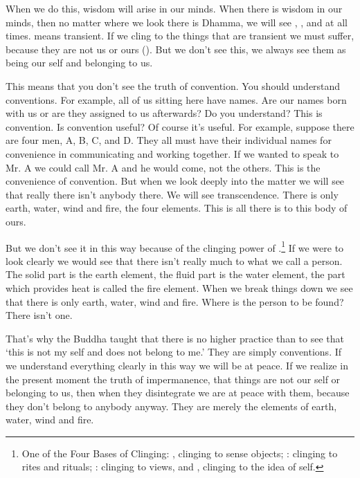 When we do this, wisdom will arise in our minds. When there is wisdom in our minds, then no matter where we look there is Dhamma, we will see , , and  at all times.  means transient. If we cling to the things that are transient we must suffer,  because they are not us or ours (). But we don't see this, we always see them as being our self and belonging to us. 

This means that you don't see the truth of convention. You should understand conventions. For example, all of us sitting here have names. Are our names born with us or are they assigned to us afterwards? Do you understand? This is convention. Is convention useful? Of course it's useful. For example, suppose there are four men, A, B, C, and D. They all must have their individual names for convenience in communicating and working together. If we wanted to speak to Mr. A we could call Mr. A and he would come, not the others. This is the convenience of convention. But when we look deeply into the matter we will see that really there isn't anybody there. We will see transcendence. There is only earth, water, wind and fire, the four elements. This is all there is to this body of ours. 

But we don't see it in this way because of the clinging power of .\footnote{One of the Four Bases of Clinging: , clinging to sense objects; : clinging to rites and rituals; : clinging to views, and , clinging to the idea of self.} If we were to look clearly we would see that there isn't really much to what we call a person. The solid part is the earth element, the fluid part is the water element, the part which provides heat is called the fire element. When we break things down we see that there is only earth, water, wind and fire. Where is the person to be found? There isn't one. 

That's why the Buddha taught that there is no higher practice than to see that `this is not my self and does not belong to me.' They are simply conventions. If we understand everything clearly in this way we will be at peace. If we realize in the present moment the truth of impermanence, that things are not our self or belonging to us, then when they disintegrate we are at peace with them, because they don't belong to anybody anyway. They are merely the elements of earth, water, wind and fire. 

